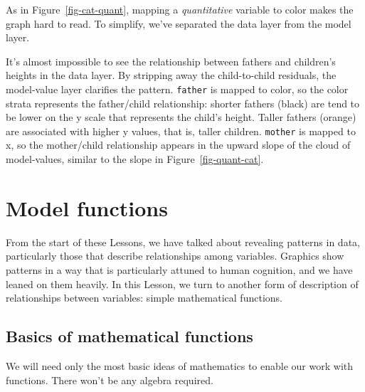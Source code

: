 \documentclass[
  letterpaper,
  DIV=11,
  numbers=noendperiod,
  oneside]{scrartcl}
\begin{document}
As in Figure~\ref{fig-cat-quant}, mapping a \emph{quantitative} variable
to color makes the graph hard to read. To simplify, we've separated the
data layer from the model layer.

It's almost impossible to see the relationship between fathers and
children's heights in the data layer. By stripping away the
child-to-child residuals, the model-value layer clarifies the pattern.
\texttt{father} is mapped to color, so the color strata represents the
father/child relationship: shorter fathers (black) are tend to be lower
on the y scale that represents the child's height. Taller fathers
(orange) are associated with higher y values, that is, taller children.
\texttt{mother} is mapped to x, so the mother/child relationship appears
in the upward slope of the cloud of model-values, similar to the slope
in Figure~\ref{fig-quant-cat}.

\newpage

\section{Model functions}\label{sec-regression}

From the start of these Lessons, we have talked about revealing patterns
in data, particularly those that describe relationships among variables.
Graphics show patterns in a way that is particularly attuned to human
cognition, and we have leaned on them heavily. In this Lesson, we turn
to another form of description of relationships between variables:
simple mathematical functions.

\subsection{Basics of mathematical
functions}\label{sec-math-function-basics}

We will need only the most basic ideas of mathematics to enable our work
with functions. There won't be any algebra required.
\end{document}
